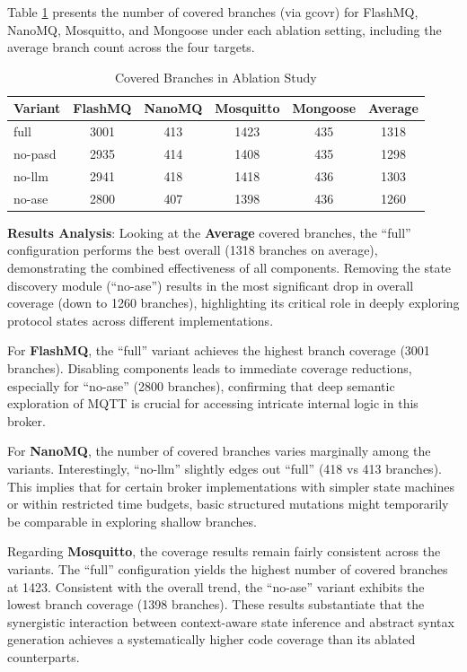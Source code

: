     Table \ref{tab:ablation} presents the number of covered branches (via gcovr) for FlashMQ, NanoMQ, Mosquitto, and Mongoose under each ablation setting, including the average branch count across the four targets.

    \begin{table}[h]
        \centering
        \caption{Covered Branches in Ablation Study}
        \label{tab:ablation}
        \begin{tabular}{lccccc}
            \toprule
            \textbf{Variant} & \textbf{FlashMQ} & \textbf{NanoMQ} & \textbf{Mosquitto} & \textbf{Mongoose} & \textbf{Average} \\
            \midrule
            full & 3001 & 413 & 1423 & 435 & 1318 \\
            no-pasd & 2935 & 414 & 1408 & 435 & 1298 \\
            no-llm & 2941 & 418 & 1418 & 436 & 1303 \\
            no-ase & 2800 & 407 & 1398 & 436 & 1260 \\
            \bottomrule
        \end{tabular}
    \end{table}
\textbf{Results Analysis}: 
Looking at the \textbf{Average} covered branches, the ``full'' configuration performs the best overall (1318 branches on average), demonstrating the combined effectiveness of all components. Removing the state discovery module (``no-ase'') results in the most significant drop in overall coverage (down to 1260 branches), highlighting its critical role in deeply exploring protocol states across different implementations.

For \textbf{FlashMQ}, the ``full'' variant achieves the highest branch coverage (3001 branches). Disabling components leads to immediate coverage reductions, especially for ``no-ase'' (2800 branches), confirming that deep semantic exploration of MQTT is crucial for accessing intricate internal logic in this broker.

For \textbf{NanoMQ}, the number of covered branches varies marginally among the variants. Interestingly, ``no-llm'' slightly edges out ``full'' (418 vs 413 branches). This implies that for certain broker implementations with simpler state machines or within restricted time budgets, basic structured mutations might temporarily be comparable in exploring shallow branches.

Regarding \textbf{Mosquitto}, the coverage results remain fairly consistent across the variants. The ``full'' configuration yields the highest number of covered branches at 1423. Consistent with the overall trend, the ``no-ase'' variant exhibits the lowest branch coverage (1398 branches). These results substantiate that the synergistic interaction between context-aware state inference and abstract syntax generation achieves a systematically higher code coverage than its ablated counterparts.

